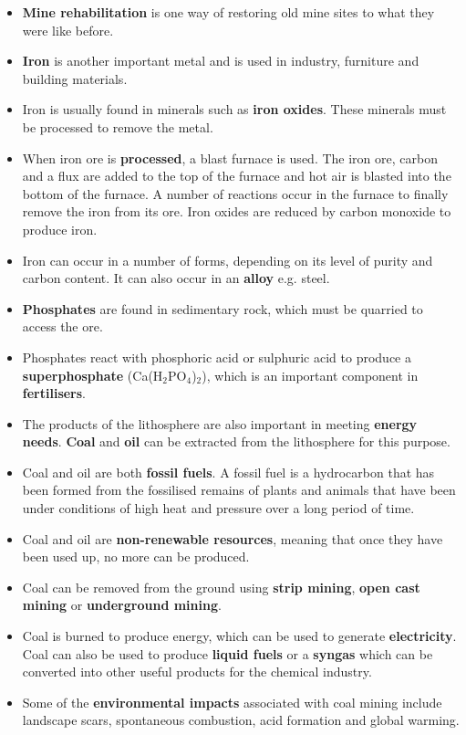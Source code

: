 \begin{itemize}
\item{\textbf{Mine rehabilitation} is one way of restoring old mine sites to what they were like before.}
\item{\textbf{Iron} is another important metal and is used in industry, furniture and building materials.}
\item{Iron is usually found in minerals such as \textbf{iron oxides}. These minerals must be processed to remove the metal.}
\item{When iron ore is \textbf{processed}, a blast furnace is used. The iron ore, carbon and a flux are added to the top of the furnace and hot air is blasted into the bottom of the furnace. A number of reactions occur in the furnace to finally remove the iron from its ore. Iron oxides are reduced by carbon monoxide to produce iron.}
\item{Iron can occur in a number of forms, depending on its level of purity and carbon content. It can also occur in an \textbf{alloy} e.g.\@{} steel.}
\item{\textbf{Phosphates} are found in sedimentary rock, which must be quarried to access the ore.}
\item{Phosphates react with phosphoric acid or sulphuric acid to produce a \textbf{superphosphate} (Ca(H$_{2}$PO$_{4}$)$_{2}$), which is an important component in \textbf{fertilisers}.}
\item{The products of the lithosphere are also important in meeting \textbf{energy needs}. \textbf{Coal} and \textbf{oil} can be extracted from the lithosphere for this purpose.}
\item{Coal and oil are both \textbf{fossil fuels}. A fossil fuel is a hydrocarbon that has been formed from the fossilised remains of plants and animals that have been under conditions of high heat and pressure over a long period of time.}
\item{Coal and oil are \textbf{non-renewable resources}, meaning that once they have been used up, no more can be produced.}
\item{Coal can be removed from the ground using \textbf{strip mining}, \textbf{open cast mining} or \textbf{underground mining}. }
\item{Coal is burned to produce energy, which can be used to generate \textbf{electricity}. Coal can also be used to produce \textbf{liquid fuels} or a \textbf{syngas} which can be converted into other useful products for the chemical industry.}
\item{Some of the \textbf{environmental impacts} associated with coal mining include landscape scars, spontaneous combustion, acid formation and global warming.}

\end{itemize}
